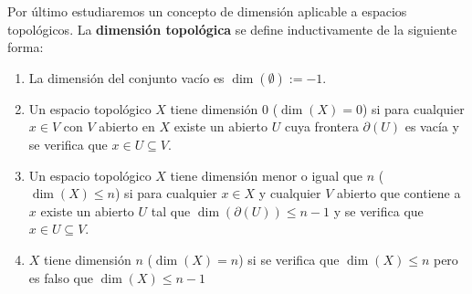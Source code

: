 Por último estudiaremos un concepto de dimensión aplicable a espacios topológicos. La \textbf{dimensión topológica} se define inductivamente de la siguiente forma:

\begin{enumerate}
\item La dimensión del conjunto vacío es $\dim(\emptyset):=-1$.
\item Un espacio topológico $X$ tiene dimensión 0 ($\dim(X)=0$) si para cualquier $x\in V$ con $V$ abierto en $X$ existe un abierto $U$ cuya frontera $\partial(U)$ es vacía y se verifica que $x\in U\subseteq V$.

\item Un espacio topológico $X$ tiene dimensión menor o igual que $n$ ($\dim(X)\leq n$) si para cualquier $x\in X$ y cualquier $V$ abierto que contiene a $x$ existe un abierto $U$ tal que $\dim(\partial(U))\leq n-1$ y se verifica que $x\in U\subseteq V$. 

\item $X$ tiene dimensión $n$ ($\dim(X)=n$) si se verifica que $\dim(X)\leq n$ pero es falso que $\dim(X)\leq n-1$
\end{enumerate}

